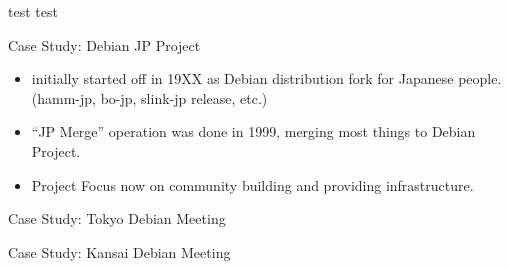 \documentclass[cjk,dvipdfm,12pt]{beamer}
\title{$BBfOQ(B Debian Meeting}
\subtitle{$B;qNA(B}
\author{$B>e@n(B $B=c0l(B Junichi Uekawa\\dancer@debian.org\\IRC nick: dancerj}
\date{10 May 2008}
\begin{document}
\frame{\titlepage{}}

\begin{frame}{test}
 test
\end{frame}

\begin{frame}{Case Study: Debian JP Project}
\begin{itemize}
 \item initially started off in 19XX as Debian distribution fork for Japanese
       people. (hamm-jp, bo-jp, slink-jp release, etc.)
 \item ``JP Merge'' operation was done in 1999, merging most things to
       Debian Project.
 \item Project Focus now on community building and providing infrastructure.
\end{itemize}
\end{frame}

\begin{frame}{Case Study: Tokyo Debian Meeting}
\end{frame}

\begin{frame}{Case Study: Kansai Debian Meeting}
\end{frame}
\end{document}
